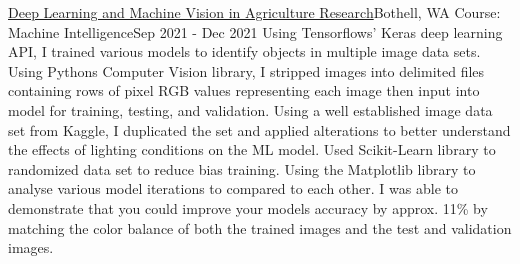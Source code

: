 \resumeSubheading
{\href{https://colab.research.google.com/drive/11OrfO4j-lhP-BlNuPEAn9pYZbiehlyr-?usp=sharing/}{Deep Learning and Machine Vision in Agriculture Research}}{Bothell, WA}
{Course: Machine Intelligence}{Sep 2021 - Dec 2021}
    \resumeItemListStart
          {Using Tensorflows' Keras deep learning API, I trained various models to identify objects in multiple image data sets. }
          {Using Pythons Computer Vision library, I stripped images into delimited files containing rows of pixel RGB values representing each image then input into model for training, testing, and validation.}
          {Using a well established image data set from Kaggle, I duplicated the set and applied alterations to better understand the effects of lighting conditions on the ML model. Used Scikit-Learn library to randomized data set to reduce bias training.}
          {Using the Matplotlib library to analyse various model iterations to compared to each other. I was able to demonstrate that you could improve your models accuracy by approx. 11\% by matching the color balance of both the trained images and the test and validation images.}
    \resumeItemListEnd